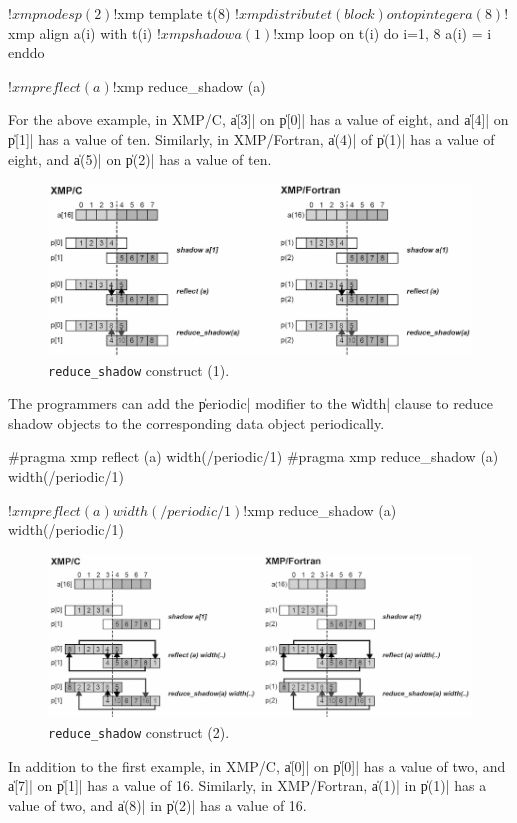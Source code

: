 \begin{XFexample}
!$xmp nodes p(2)
!$xmp template t(8)
!$xmp distribute t(block) onto p
  integer a(8)
!$xmp align a(i) with t(i)
!$xmp shadow a(1)

!$xmp loop on t(i)
  do i=1, 8
    a(i) = i
  enddo

!$xmp reflect (a)
!$xmp reduce_shadow (a)
\end{XFexample}


For the above example, in XMP/C, \|a[3]| on \|p[0]| has a value of eight,
and \|a[4]| on \|p[1]| has a value of ten. Similarly, in XMP/Fortran,
\|a(4)| of \|p(1)| has a value of eight, and \|a(5)| on \|p(2)| has a
value of ten.

\begin{figure}
  \centering
  \includegraphics[width=\textwidth]{figs/reduce_shadow.png}
  \caption{{\tt reduce\_shadow} construct (1).}
\end{figure}

The programmers can add the \|periodic| modifier to the \|width| clause
to reduce shadow objects to the corresponding data object periodically.

\begin{XCexample}
#pragma xmp reflect (a) width(/periodic/1)
#pragma xmp reduce_shadow (a) width(/periodic/1)
\end{XCexample}

\begin{XFexample}
!$xmp reflect (a) width(/periodic/1)
!$xmp reduce_shadow (a) width(/periodic/1)
\end{XFexample}

\begin{figure}
  \centering
  \includegraphics[width=\textwidth]{figs/reduce_shadow_periodic.png}
  \caption{{\tt reduce\_shadow} construct (2).}
\end{figure}

In addition to the first example, in XMP/C, \|a[0]| on \|p[0]| has a
value of two, and \|a[7]| on \|p[1]| has a value of 16. Similarly, in
XMP/Fortran, \|a(1)| in \|p(1)| has a value of two, and \|a(8)| in
\|p(2)| has a value of 16.
